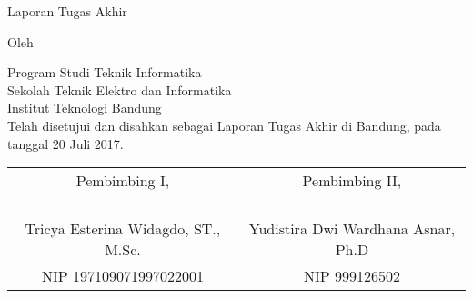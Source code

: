 \clearpage
\pagestyle{empty}

\begin{center}
\smallskip

    \Large \bfseries \MakeUppercase{\thetitle}
    \vfill

    \Large Laporan Tugas Akhir
    \vfill

    \large Oleh

    \Large \theauthor

    \large Program Studi Teknik Informatika \\
    Sekolah Teknik Elektro dan Informatika \\
    Institut Teknologi Bandung \\

    \vfill
    \normalsize \normalfont
    Telah disetujui dan disahkan sebagai Laporan Tugas Akhir di Bandung, pada tanggal 20 Juli 2017.

    \vfill
    \setlength{\tabcolsep}{12pt}
    \begin{tabular}{c@{\hskip 0.5in}c}
        Pembimbing I, & Pembimbing II, \\
        & \\
        & \\
        & \\
        & \\
        Tricya Esterina Widagdo, ST., M.Sc. & Yudistira Dwi Wardhana Asnar, Ph.D \\
        NIP 197109071997022001 & NIP 999126502 \\
    \end{tabular}

\end{center}
\clearpage
